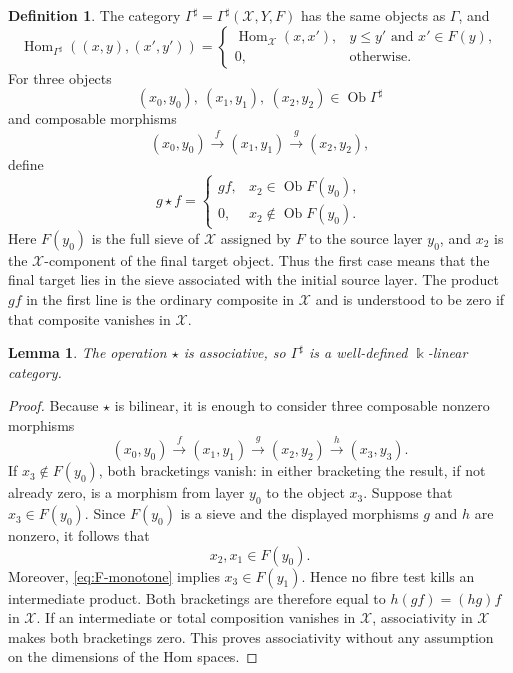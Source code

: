 \documentclass[12pt,a4paper,english,reqno]{amsart}
\theoremstyle{plain}
\newtheorem{lemma}[theorem]{Lemma}
\theoremstyle{definition}
\newtheorem{definition}[theorem]{Definition}
\newcommand{\kk}{\Bbbk}
\newcommand{\Hom}{\operatorname{Hom}}
\newcommand{\X}{\mathcal X}
\newcommand{\G}{\Gamma}
\newcommand{\Gs}{\Gamma^{\sharp}}
\begin{document}
\begin{definition}
\label{def:Gamma-sharp}
The category $\Gs=\Gs(\X,Y,F)$ has the same objects as $\G$, and
\begin{equation}
 \Hom_{\Gs}((x,y),(x',y'))=
 \begin{cases}
 \Hom_{\X}(x,x'),&y\leq y'\text{ and }x'\in F(y),\\
 0,&\text{otherwise}.
 \end{cases}
\label{eq:Gamma-sharp-hom}
\end{equation}
For three objects
\[
(x_0,y_0),\ (x_1,y_1),\ (x_2,y_2)\in\operatorname{Ob}\Gs
\]
and composable morphisms
\[
(x_0,y_0)\xrightarrow{f}(x_1,y_1)
\xrightarrow{g}(x_2,y_2),
\]
define
\begin{equation}
g\star f=
\begin{cases}
gf, & x_2\in\operatorname{Ob}F(y_0),\\
0,  & x_2\notin\operatorname{Ob}F(y_0).
\end{cases}
\label{eq:sharp-composition}
\end{equation}
Here $F(y_0)$ is the full sieve of $\X$ assigned by $F$ to the
source layer $y_0$, and $x_2$ is the $\X$-component of the final
target object. Thus the first case means that the final target lies
in the sieve associated with the initial source layer. The product
$gf$ in the first line is the ordinary composite in $\X$ and is
understood to be zero if that composite vanishes in $\X$.
\end{definition}





\begin{lemma}
\label{lem:associativity}
The operation $\star$ is associative, so $\Gs$ is a well-defined
$\kk$-linear category.
\end{lemma}

\begin{proof}
Because $\star$ is bilinear, it is enough to consider three composable
nonzero morphisms
\[
 (x_0,y_0)\xrightarrow{f}(x_1,y_1)
 \xrightarrow{g}(x_2,y_2)
 \xrightarrow{h}(x_3,y_3).
\]
If $x_3\notin F(y_0)$, both bracketings vanish: in either bracketing the
result, if not already zero, is a morphism from layer $y_0$ to the object
$x_3$.  Suppose that $x_3\in F(y_0)$.  Since $F(y_0)$ is a sieve and
the displayed morphisms $g$ and $h$ are nonzero, it follows that
\[
 x_2,x_1\in F(y_0).
\]
Moreover, \eqref{eq:F-monotone} implies $x_3\in F(y_1)$.  Hence no fibre
test kills an intermediate product.  Both bracketings are therefore equal to
$h(gf)=(hg)f$ in $\X$.  If an intermediate or total composition vanishes
in $\X$, associativity in $\X$ makes both bracketings zero.  This proves
associativity without any assumption on the dimensions of the Hom spaces.
\end{proof}
\end{document}
